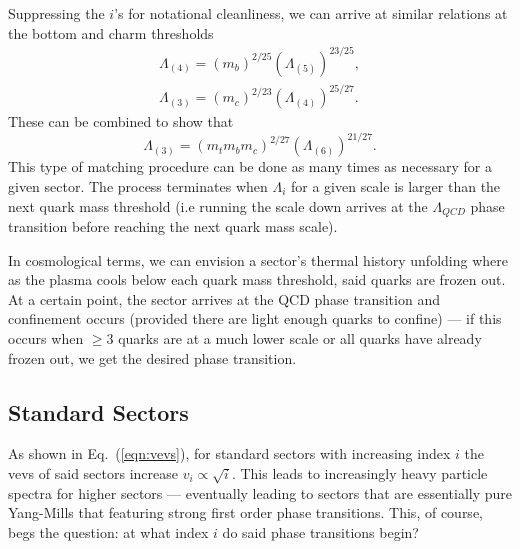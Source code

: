 \documentclass[nofootinbib,twocolumn,preprintnumbers]{revtex4-1}
\begin{document}
Suppressing the $i$'s for notational cleanliness, we can arrive at similar relations at the bottom and charm thresholds
\begin{equation}
\begin{split}
\Lambda_{(4)} = (m_b)^{2/25}(\Lambda_{(5)})^{23/25},
\\
\Lambda_{(3)} = (m_c)^{2/23}(\Lambda_{(4)})^{25/27}.
\end{split}
\end{equation}
These can be combined to show that
\begin{equation}
\Lambda_{(3)} = (m_t m_b m_c)^{2/27}(\Lambda_{(6)})^{21/27}.
\end{equation}
This type of matching procedure can be done as many times as necessary for a given sector. The process terminates when $\Lambda_i$ for a given scale is larger than the next quark mass threshold (i.e running the scale down arrives at the $\Lambda_{QCD}$ phase transition before reaching the next quark mass scale).

In cosmological terms, we can envision a sector's thermal history unfolding where as the plasma cools below each quark mass threshold, said quarks are frozen out. At a certain point, the sector arrives at the QCD phase transition and confinement occurs (provided there are light enough quarks to confine) --- if this occurs when $\geq 3$ quarks are at a much lower scale or all quarks have already frozen out, we get the desired phase transition.   

\subsection{Standard Sectors}

As shown in Eq.~(\ref{eqn:vevs}), for standard sectors with increasing index $i$ the vevs of said sectors increase $v_i\propto \sqrt{i}$. This leads to increasingly heavy particle spectra for higher sectors --- eventually leading to sectors that are essentially pure Yang-Mills that featuring strong first order phase transitions. This, of course, begs the question: at what index $i$ do said phase transitions begin?

\end{document}
